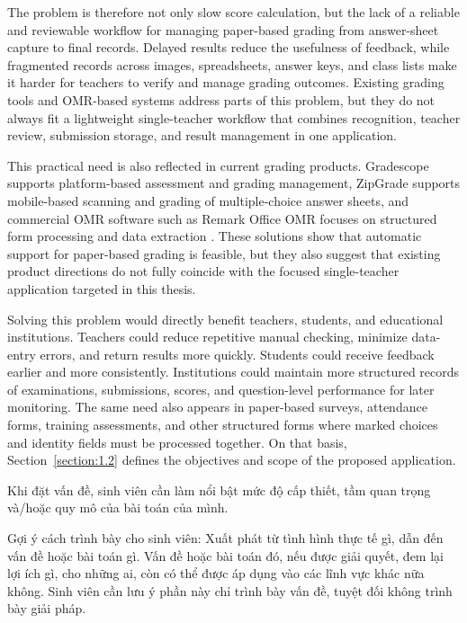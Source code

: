 \documentclass[../Main.tex]{subfiles}
\begin{document}
The problem is therefore not only slow score calculation, but the lack of a reliable and reviewable workflow for managing paper-based grading from answer-sheet capture to final records. Delayed results reduce the usefulness of feedback, while fragmented records across images, spreadsheets, answer keys, and class lists make it harder for teachers to verify and manage grading outcomes. Existing grading tools and OMR-based systems address parts of this problem, but they do not always fit a lightweight single-teacher workflow that combines recognition, teacher review, submission storage, and result management in one application.

This practical need is also reflected in current grading products. Gradescope
supports platform-based assessment and grading management, ZipGrade supports
mobile-based scanning and grading of multiple-choice answer sheets, and
commercial OMR software such as Remark Office OMR focuses on structured form
processing and data extraction
\cite{gradescope2026,zipgrade2026,remarkoffice2026}. These solutions show that
automatic support for paper-based grading is feasible, but they also suggest
that existing product directions do not fully coincide with the focused
single-teacher application targeted in this thesis.

Solving this problem would directly benefit teachers, students, and
educational institutions. Teachers could reduce repetitive manual checking,
minimize data-entry errors, and return results more quickly. Students could
receive feedback earlier and more consistently. Institutions could maintain
more structured records of examinations, submissions, scores, and
question-level performance for later monitoring. The same need also appears in
paper-based surveys, attendance forms, training assessments, and other
structured forms where marked choices and identity fields must be processed
together. On that basis, Section~\ref{section:1.2} defines the objectives and
scope of the proposed application.

\iffalse
Khi đặt vấn đề, sinh viên cần làm nổi bật mức độ cấp thiết, tầm quan trọng và/hoặc quy mô của bài toán của mình.

Gợi ý cách trình bày cho sinh viên: Xuất phát từ tình hình thực tế gì, dẫn đến vấn đề hoặc bài toán gì. Vấn đề hoặc bài toán đó, nếu được giải quyết, đem lại lợi ích gì, cho những ai, còn có thể được áp dụng vào các lĩnh vực khác nữa không. Sinh viên cần lưu ý phần này chỉ trình bày vấn đề, tuyệt đối không trình bày giải pháp.
\end{document}
